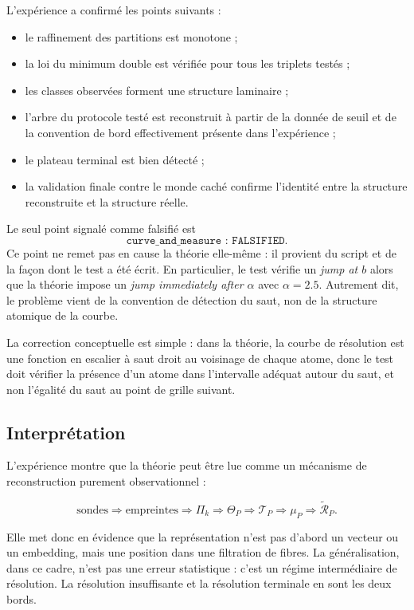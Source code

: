 \documentclass[11pt,a4paper,openany]{book}
\begin{document}
L'expérience a confirmé les points suivants :

\begin{itemize}[leftmargin=1.4em]
\item le raffinement des partitions est monotone ;
\item la loi du minimum double est vérifiée pour tous les triplets testés ;
\item les classes observées forment une structure laminaire ;
\item l'arbre du protocole testé est reconstruit à partir de la donnée de seuil et de la convention de bord effectivement présente dans l'expérience ;
\item le plateau terminal est bien détecté ;
\item la validation finale contre le monde caché confirme l'identité entre la structure reconstruite et la structure réelle.
\end{itemize}

Le seul point signalé comme falsifié est
\[
\texttt{curve\_and\_measure : FALSIFIED}.
\]
Ce point ne remet pas en cause la théorie elle-même : il provient du script et de la façon dont le test a été écrit. En particulier, le test vérifie un \emph{jump at \(b\)} alors que la théorie impose un \emph{jump immediately after \(\alpha\)} avec \(\alpha=2.5\). Autrement dit, le problème vient de la convention de détection du saut, non de la structure atomique de la courbe.

La correction conceptuelle est simple : dans la théorie, la courbe de résolution est une fonction en escalier à saut droit au voisinage de chaque atome, donc le test doit vérifier la présence d'un atome dans l'intervalle adéquat autour du saut, et non l'égalité du saut au point de grille suivant.

\subsection{Interprétation}

L'expérience montre que la théorie peut être lue comme un mécanisme de reconstruction purement observationnel :

\[
\text{sondes}
\Longrightarrow
\text{empreintes}
\Longrightarrow
\Pi_k
\Longrightarrow
\Theta_P
\Longrightarrow
\mathcal T_P
\Longrightarrow
\mu_P
\Longrightarrow
\widetilde{\mathcal R}_P.
\]

Elle met donc en évidence que la représentation n'est pas d'abord un vecteur ou un embedding, mais une position dans une filtration de fibres. La généralisation, dans ce cadre, n'est pas une erreur statistique : c'est un régime intermédiaire de résolution. La résolution insuffisante et la résolution terminale en sont les deux bords.
\end{document}

